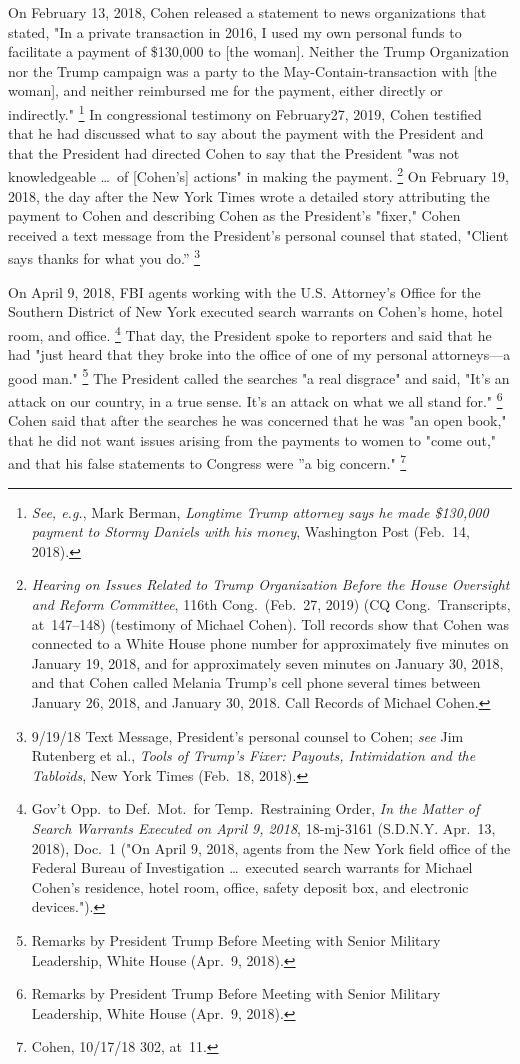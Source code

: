 {On February 13, 2018, Cohen released a statement to news organizations that stated, "In a private transaction in 2016, I used my own personal funds to facilitate a payment of \$130,000 to [the woman].
Neither the Trump Organization nor the Trump campaign was a party to the May-Contain-transaction with [the woman], and neither reimbursed me for the payment, either directly or indirectly."%
\footnote{\textit{See, e.g.}, Mark Berman, \textit{Longtime Trump attorney says he made \$130,000 payment to Stormy Daniels with his money}, Washington Post (Feb.~14, 2018).}
In congressional testimony on February27, 2019, Cohen testified that he had discussed what to say about the payment with the President and that the President had directed Cohen to say that the President "was not knowledgeable \dots\ of [Cohen's] actions" in making the payment.%
\footnote{\textit{Hearing on Issues Related to Trump Organization Before the House Oversight and Reform Committee}, 116th Cong.\ (Feb.~27, 2019) (CQ Cong.\ Transcripts, at~147--148) (testimony of Michael Cohen).
Toll records show that Cohen was connected to a White House phone number for approximately five minutes on January 19, 2018, and for approximately seven minutes on January 30, 2018, and that Cohen called Melania Trump's cell phone several times between January 26, 2018, and January 30, 2018.
Call Records of Michael Cohen.}
On February 19, 2018, the day after the New York Times wrote a detailed story attributing the payment to Cohen and describing Cohen as the President's "fixer," Cohen received a text message from the President's personal counsel that stated, "Client says thanks for what you do.''%
\footnote{9/19/18 Text Message, President's personal counsel to Cohen;
\textit{see} Jim Rutenberg et al., \textit{Tools of Trump's Fixer: Payouts, Intimidation and the Tabloids}, New York Times (Feb.~18, 2018).}

On April 9, 2018, FBI agents working with the U.S. Attorney's Office for the Southern District of New York executed search warrants on Cohen's home, hotel room, and office.%
\footnote{Gov't Opp.\ to Def.\ Mot.\ for Temp.\ Restraining Order, \textit{In the Matter of Search Warrants Executed on April 9, 2018}, 18-mj-3161 (S.D.N.Y. Apr.~13, 2018), Doc.~1
("On April 9, 2018, agents from the New York field office of the Federal Bureau of Investigation \dots\ executed search warrants for Michael Cohen's residence, hotel room, office, safety deposit box, and electronic devices.").}
That day, the President spoke to reporters and said that he had "just heard that they broke into the office of one of my personal attorneys---a good man."%
\footnote{Remarks by President Trump Before Meeting with Senior Military Leadership, White House (Apr.~9, 2018).}
The President called the searches "a real disgrace" and said, "It's an attack on our country, in a true sense.
It's an attack on what we all stand for."%
\footnote{Remarks by President Trump Before Meeting with Senior Military Leadership, White House (Apr.~9, 2018).}
Cohen said that after the searches he was concerned that he was "an open book," that he did not want issues arising from the payments to women to "come out," and that his false statements to Congress were ''a big concern."%
\footnote{Cohen, 10/17/18 302, at~11.}

}
